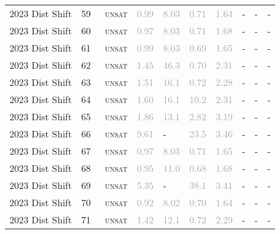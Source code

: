 \begin{center}
{\begin{longtable}{@{}llllllllll@{}}
2023 Dist Shift & 59 & ~\textsc{unsat} & \textcolor{darkgray}{0.99} & \textcolor{darkgray}{8.03} & \textcolor{darkgray}{0.71} & \textcolor{darkgray}{1.64} & - & - & - \\
2023 Dist Shift & 60 & ~\textsc{unsat} & \textcolor{darkgray}{0.97} & \textcolor{darkgray}{8.03} & \textcolor{darkgray}{0.71} & \textcolor{darkgray}{1.68} & - & - & - \\
2023 Dist Shift & 61 & ~\textsc{unsat} & \textcolor{darkgray}{0.99} & \textcolor{darkgray}{8.03} & \textcolor{darkgray}{0.69} & \textcolor{darkgray}{1.65} & - & - & - \\
2023 Dist Shift & 62 & ~\textsc{unsat} & \textcolor{darkgray}{1.45} & \textcolor{darkgray}{46.3} & \textcolor{darkgray}{0.70} & \textcolor{darkgray}{2.31} & - & - & - \\
2023 Dist Shift & 63 & ~\textsc{unsat} & \textcolor{darkgray}{1.51} & \textcolor{darkgray}{16.1} & \textcolor{darkgray}{0.72} & \textcolor{darkgray}{2.28} & - & - & - \\
2023 Dist Shift & 64 & ~\textsc{unsat} & \textcolor{darkgray}{1.60} & \textcolor{darkgray}{16.1} & \textcolor{darkgray}{10.2} & \textcolor{darkgray}{2.31} & - & - & - \\
2023 Dist Shift & 65 & ~\textsc{unsat} & \textcolor{darkgray}{1.86} & \textcolor{darkgray}{13.1} & \textcolor{darkgray}{2.82} & \textcolor{darkgray}{3.19} & - & - & - \\
2023 Dist Shift & 66 & ~\textsc{unsat} & \textcolor{darkgray}{9.61} & - & \textcolor{darkgray}{23.5} & \textcolor{darkgray}{3.46} & - & - & - \\
2023 Dist Shift & 67 & ~\textsc{unsat} & \textcolor{darkgray}{0.97} & \textcolor{darkgray}{8.03} & \textcolor{darkgray}{0.71} & \textcolor{darkgray}{1.65} & - & - & - \\
2023 Dist Shift & 68 & ~\textsc{unsat} & \textcolor{darkgray}{0.95} & \textcolor{darkgray}{11.0} & \textcolor{darkgray}{0.68} & \textcolor{darkgray}{1.68} & - & - & - \\
2023 Dist Shift & 69 & ~\textsc{unsat} & \textcolor{darkgray}{5.35} & - & \textcolor{darkgray}{38.1} & \textcolor{darkgray}{3.41} & - & - & - \\
2023 Dist Shift & 70 & ~\textsc{unsat} & \textcolor{darkgray}{0.92} & \textcolor{darkgray}{8.02} & \textcolor{darkgray}{0.70} & \textcolor{darkgray}{1.64} & - & - & - \\
2023 Dist Shift & 71 & ~\textsc{unsat} & \textcolor{darkgray}{1.42} & \textcolor{darkgray}{12.1} & \textcolor{darkgray}{0.72} & \textcolor{darkgray}{2.29} & - & - & - \\

\end{longtable}}
\end{center}
